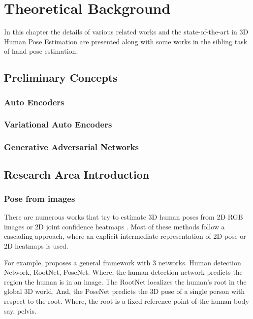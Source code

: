 \chapter{Theoretical Background}
\label{chap:background}

In this chapter the details of various related works and the state-of-the-art in 3D Human Pose Estimation are presented along with some works in the sibling task of hand pose estimation.

\section{Preliminary Concepts}
\label{sec:Preliminary}

\subsection{Auto Encoders}
\lipsum[1-4] %
\subsection{Variational Auto Encoders}
\lipsum[1-4] %
\subsection{Generative Adversarial Networks}
\lipsum[1-4] %

\section{Research Area Introduction}
\label{sec:field introduction}

\subsection{Pose from images}
There are numerous works that try to estimate 3D human poses from 2D \ac{RGB} images or 2D joint confidence heatmaps \cite{CameraDistanceAware, poselifter, DistillNRSfM, occlusionVideo}. Most of these methods follow a cascading approach, where an explicit intermediate representation of 2D pose or 2D heatmaps is used.

For example, \cite{CameraDistanceAware} proposes a general framework with 3 networks. Human detection Network, RootNet, PoseNet. Where, the human detection network predicts the region the human is in an image. The RootNet localizes the human's root in the global 3D world. And, the PoseNet predicts the 3D pose of a single person with respect to the root. Where, the root is a fixed reference point of the human body say, pelvis.

